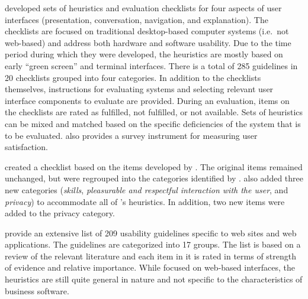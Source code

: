  developed sets of heuristics and evaluation checklists for four aspects of user interfaces (presentation, conversation, navigation, and explanation). The checklists are focused on traditional desktop-based computer systems (i.e.\ not web-based) and address both hardware and software usability. Due to the time period during which they were developed, the heuristics are mostly based on early ``green screen'' and terminal interfaces. There is a total of 285 guidelines in 20 checklists grouped into four categories. In addition to the checklists themselves, instructions for evaluating systems and selecting relevant user interface components to evaluate are provided. During an evaluation, items on the checklists are rated as fulfilled, not fulfilled, or not available. Sets of heuristics can be mixed and matched based on the specific deficiencies of the system that is to be evaluated.  also provides a survey instrument for measuring user satisfaction.

 created a checklist based on the items developed by \citet{Weiss1994}. The original items remained unchanged, but were regrouped into the categories identified by \citet{Nielsen1994a}.  also added three new categories (\textit{skills}, \textit{pleasurable and respectful interaction with the user}, and \textit{privacy}) to accommodate all of \citeauthor{Weiss1994}'s heuristics. In addition, two new items were added to the privacy category.

 provide an extensive list of 209 usability guidelines specific to web sites and web applications. The guidelines are categorized into 17 groups. The list is based on a review of the relevant literature and each item in it is rated in terms of strength of evidence and relative importance. While focused on web-based interfaces, the heuristics are still quite general in nature and not specific to the characteristics of business software.

